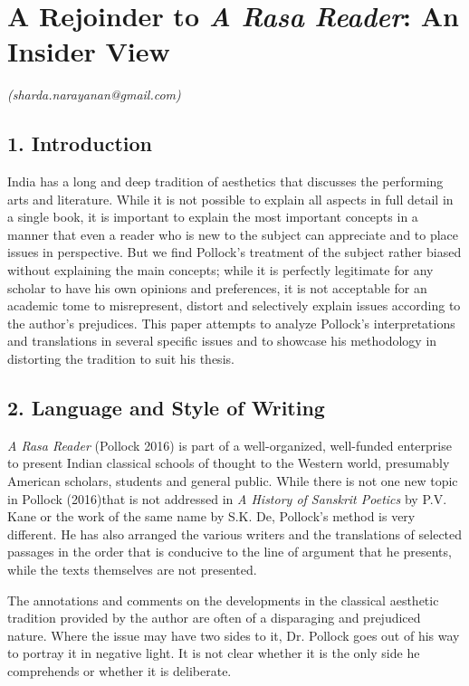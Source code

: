 
\chapter{A Rejoinder to \textit{A Rasa Reader}: An Insider View}\label{chapter9}


\begin{flushright}
\textit{(sharda.narayanan@gmail.com)}
\end{flushright}


\section*{1. Introduction}

India has a long and deep tradition of aesthetics that discusses the performing arts and literature. While it is not possible to explain all aspects in full detail in a single book, it is important to explain the most important concepts in a manner that even a reader who is new to the subject can appreciate and to place issues in perspective. But we find Pollock’s treatment of the subject rather biased without explaining the main concepts; while it is perfectly legitimate for any scholar to have his own opinions and preferences, it is not acceptable for an academic tome to misrepresent, distort and selectively explain issues according to the author’s prejudices. This paper attempts to analyze Pollock’s interpretations and translations in several specific issues and to showcase his methodology in distorting the tradition to suit his thesis.


\section*{2. Language and Style of Writing}

\textit{A Rasa Reader} (Pollock 2016) is part of a well-organized, well-funded enterprise to present Indian classical schools of thought to the Western world, presumably American scholars, students and general public. While there is not one new topic in Pollock (2016)that is not addressed in \textit{A History of Sanskrit Poetics} by P.V. Kane or the work of the same name by S.K. De, Pollock’s method is very different. He has also arranged the various writers and the translations of selected passages in the order that is conducive to the line of argument that he presents, while the texts themselves are not presented.

The annotations and comments on the developments in the classical aesthetic tradition provided by the author are often of a disparaging and prejudiced nature. Where the issue may have two sides to it, Dr. Pollock goes out of his way to portray it in negative light. It is not clear whether it is the only side he comprehends or whether it is deliberate.

